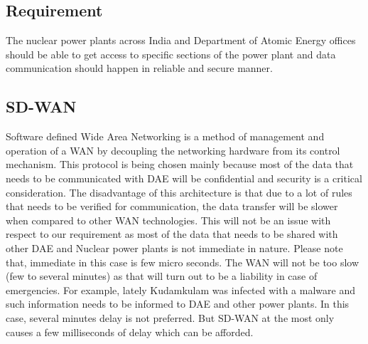 \documentclass{article}
\begin{document}
\subsection{Requirement}
The nuclear power plants across India and Department of Atomic Energy offices should be able to get access to specific sections of the power plant and data communication should happen in reliable and secure manner.
\subsection{SD-WAN}
Software defined Wide Area Networking is a method of management and operation of a WAN by decoupling the networking hardware from its control mechanism. This protocol is being chosen mainly because most of the data that needs to be communicated with DAE will be confidential and security is a critical consideration. The disadvantage of this architecture is that due to a lot of rules that needs to be verified for communication, the data transfer will be slower when compared to other WAN technologies. This will not be an issue with respect to our requirement as most of the data that needs to be shared with other DAE and Nuclear power plants is not immediate in nature. Please note that, immediate in this case is few micro seconds. The WAN will not be too slow (few to several minutes) as that will turn out to be a liability in case of emergencies. For example, lately Kudamkulam was infected with a malware and such information needs to be informed to DAE and other power plants. In this case, several minutes delay is not preferred. But SD-WAN at the most only causes a few milliseconds of delay which can be afforded.
\end{document}
